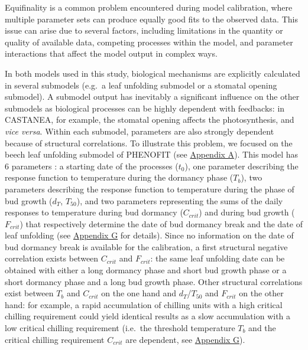 Equifinality is a common problem encountered during model calibration,
where multiple parameter sets can produce equally good fits to the
observed data. This issue can arise due to several factors, including
limitations in the quantity or quality of available data, competing
processes within the model, and parameter interactions that affect the
model output in complex ways.

In both models used in this study, biological mechanisms are explicitly
calculated in several submodels (e.g.~a leaf unfolding submodel or a
stomatal opening submodel). A submodel output has inevitably a
significant influence on the other submodels as biological processes can
be highly dependent with feedbacks: in CASTANEA, for example, the
stomatal opening affects the photosynthesis, and \emph{vice versa}.
Within each submodel, parameters are also strongly dependent because of
structural correlations. To illustrate this problem, we focused on the
beech leaf unfolding submodel of PHENOFIT (see
\hyperref[chap1:appendixA]{Appendix A}). This model has 6 parameters
\citep{Chuine2000}: a starting date of
the processes (\(t_0\)), one parameter describing the response function
to temperature during the dormancy phase (\(T_b\)), two parameters
describing the response function to temperature during the phase of bud
growth (\(d_T\), \(T_{50}\)), and two parameters representing the sums
of the daily responses to temperature during bud dormancy (\(C_{crit}\))
and during bud growth (\(F_{crit}\)) that respectively determine the
date of bud dormancy break and the date of leaf unfolding (see
\hyperref[chap1:appendixG]{Appendix G} for details). Since no
information on the date of bud dormancy break is available for the
calibration, a first structural negative correlation exists between
\(C_{crit}\) and \(F_{crit}\): the same leaf unfolding date can be
obtained with either a long dormancy phase and short bud growth phase or
a short dormancy phase and a long bud growth phase. Other structural
correlations exist between \(T_b\) and \(C_{crit}\) on the one hand and
\(d_T\)/\(T_{50}\) and \(F_{crit}\) on the other hand: for example, a
rapid accumulation of chilling units with a high critical chilling
requirement could yield identical results as a slow accumulation with a
low critical chilling requirement (i.e.~the threshold temperature
\(T_{b}\) and the critical chilling requirement \(C_{crit}\) are
dependent, see \hyperref[chap1:appendixG]{Appendix G}).

